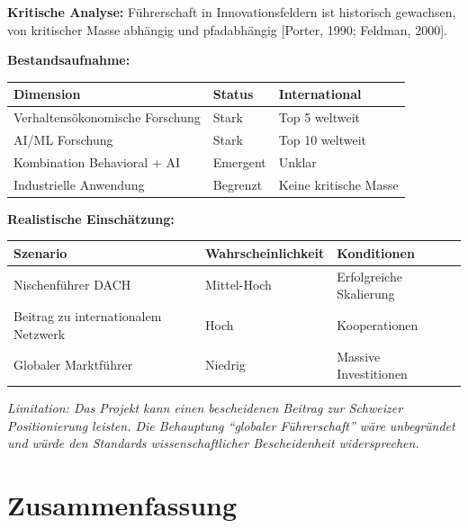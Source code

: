 \documentclass[11pt,a4paper]{article}
\newcommand{\limitation}[1]{\textcolor{limitation}{\textit{Limitation: #1}}}
\newcommand{\evidence}[1]{\textcolor{fehrgray}{[#1]}}
\begin{document}
\textbf{Kritische Analyse:} Führerschaft in Innovationsfeldern ist historisch gewachsen, von kritischer Masse abhängig und pfadabhängig \evidence{Porter, 1990; Feldman, 2000}.

\textbf{Bestandsaufnahme:}

\begin{table}[h]
\centering
\begin{tabular}{@{}L{4.5cm}L{4cm}L{4cm}@{}}
\toprule
\textbf{Dimension} & \textbf{Status} & \textbf{International} \\
\midrule
Verhaltensökonomische Forschung & Stark & Top 5 weltweit \\
AI/ML Forschung & Stark & Top 10 weltweit \\
Kombination Behavioral + AI & Emergent & Unklar \\
Industrielle Anwendung & Begrenzt & Keine kritische Masse \\
\bottomrule
\end{tabular}
\end{table}

\textbf{Realistische Einschätzung:}

\begin{table}[h]
\centering
\begin{tabular}{@{}L{6cm}C{4cm}L{3.5cm}@{}}
\toprule
\textbf{Szenario} & \textbf{Wahrscheinlichkeit} & \textbf{Konditionen} \\
\midrule
Nischenführer DACH & Mittel-Hoch & Erfolgreiche Skalierung \\
Beitrag zu internationalem Netzwerk & Hoch & Kooperationen \\
Globaler Marktführer & Niedrig & Massive Investitionen \\
\bottomrule
\end{tabular}
\end{table}

\limitation{Das Projekt kann einen bescheidenen Beitrag zur Schweizer Positionierung leisten. Die Behauptung ``globaler Führerschaft'' wäre unbegründet und würde den Standards wissenschaftlicher Bescheidenheit widersprechen.}

\newpage
\section{Zusammenfassung}
\end{document}
